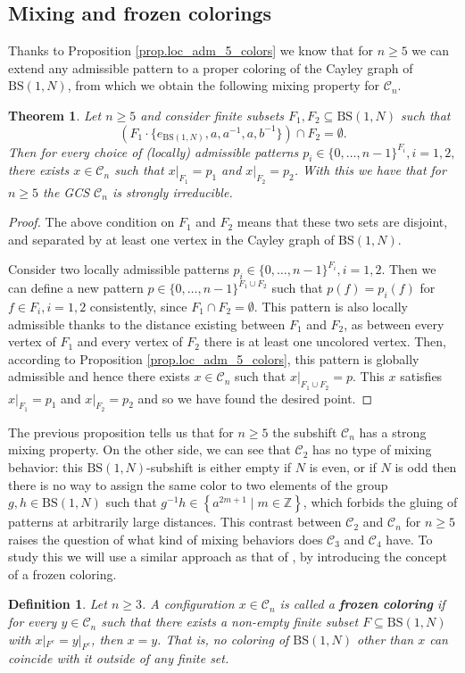 \documentclass[letterpaper,10pt]{article}
\theoremstyle{plain}
\newtheorem{theorem}{Theorem}[section]
\newtheorem{definition}{Definition}[section]
\newcommand{\BS}[1][N]{\mathrm{BS}(1,#1)}
\begin{document}
	\subsection{Mixing and frozen colorings}\label{subsection.mixing_and frozen}
Thanks to Proposition \ref{prop.loc_adm_5_colors} we know that for $n\ge 5$ we can extend any admissible pattern to a proper coloring of the Cayley graph of $\BS$, from which we obtain the following mixing property for $\mathcal{C}_n$.
\begin{theorem}\label{thm:gcs_mixing_n5} Let $n\ge 5$ and consider finite subsets $F_1,F_2\subseteq \BS$ such that 
	$$\left( F_1\cdot \{e_{\BS},a,a^{-1},a,b^{-1}\}\right)\cap F_2=\emptyset.$$
  Then for every choice of (locally) admissible patterns $p_i\in \{0,\ldots,n-1\}^{F_i}, i=1,2,$ there exists $x\in \mathcal{C}_n$ such that $x|_{F_1}=p_1$ and $x|_{F_2}=p_2$. With this we have that for $n\ge 5$ the GCS $\mathcal{C}_n$ is strongly irreducible.
\end{theorem}
\begin{proof}
	The above condition on $F_1$ and $F_2$ means that these two sets are disjoint, and separated by at least one vertex in the Cayley graph of $\BS$. 
	
	Consider two locally admissible patterns $p_i\in \{0,\ldots,n-1\}^{F_i}, i=1,2$. Then we can define a new pattern $p\in \{0,\ldots,n-1\}^{F_1\cup F_2}$ such that $p(f)=p_i(f)$ for $f\in F_i, i=1,2$ consistently, since $F_1\cap F_2=\emptyset.$ This pattern is also locally admissible thanks to the distance existing between $F_1$ and $F_2$, as between every vertex of $F_1$ and every vertex of $F_2$ there is at least one uncolored vertex. Then, according to Proposition \ref{prop.loc_adm_5_colors}, this pattern is globally admissible and hence there exists $x\in \mathcal{C}_n$ such that $x|_{F_1\cup F_2}=p$. This $x$ satisfies $x|_{F_1}=p_1$ and $x|_{F_2}=p_2$ and so we have found the desired point.
\end{proof}


The previous proposition tells us that for $n\ge 5$ the subshift $\mathcal{C}_n$ has a strong mixing property. On the other side, we can see that $\mathcal{C}_2$ has no type of mixing behavior: this $\BS$-subshift is either empty if $N$ is even, or if $N$ is odd then there is no way to assign the same color to two elements of the group $g,h\in \BS$ such that $g^{-1}h\in \left\{a^{2m+1}\mid m\in \mathbb{Z} \right\}$, which forbids the gluing of patterns at arbitrarily large distances. This contrast between $\mathcal{C}_2$ and $\mathcal{C}_n$ for $n\ge 5$ raises the question of what kind of mixing behaviors does $\mathcal{C}_3$ and $\mathcal{C}_4$ have. To study this we will use a similar approach as that of \cite{alon2019mixing}, by introducing the concept of a frozen coloring.
\begin{definition} Let $n\ge 3$. A configuration $x\in \mathcal{C}_n$ is called a \textbf{frozen coloring} if for every $y\in \mathcal{C}_n$ such that there exists a non-empty finite subset $F\subseteq \BS$ with $x|_{F^c}=y|_{F^c}$, then $x= y$. That is, no coloring of $\BS$ other than $x$ can coincide with it outside of any finite set.
\end{definition}
\end{document}
